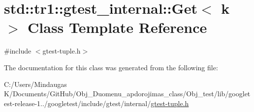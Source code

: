 \hypertarget{classstd_1_1tr1_1_1gtest__internal_1_1_get}{}\section{std\+::tr1\+::gtest\+\_\+internal\+::Get$<$ k $>$ Class Template Reference}
\label{classstd_1_1tr1_1_1gtest__internal_1_1_get}


{\ttfamily \#include $<$gtest-\/tuple.\+h$>$}



The documentation for this class was generated from the following file\+:\begin{DoxyCompactItemize}
\item 
C\+:/\+Users/\+Mindaugas K/\+Documents/\+Git\+Hub/\+Obj\+\_\+\+Duomenu\+\_\+apdorojimas\+\_\+class/\+Obj\+\_\+test/lib/googletest-\/release-\/1../googletest/include/gtest/internal/\mbox{\hyperlink{gtest-tuple_8h}{gtest-\/tuple.\+h}}\end{DoxyCompactItemize}
